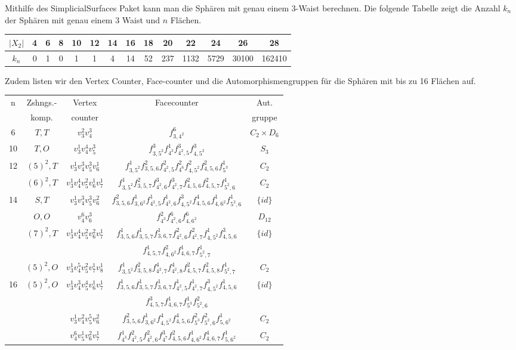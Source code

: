 \documentclass[12pt,titlepage,twoside,cleardoublepage]{article}
\theoremstyle{nummermitklammern}
\numberwithin{equation}{section}
\begin{document}
Mithilfe des SimplicialSurfaces Paket kann man die Sphären mit genau einem 3-Waist berechnen. Die folgende Tabelle zeigt die Anzahl $k_n$ der Sphären mit genau einem 3 Waist und $n$ Flächen. 
\begin{center}
\begin{tabular}[h]{|c|c|c|c|c|c|c|c|c|c|c|c|c|c|}
\hline
\textbf{$\vert X_2\vert$}& \textbf{4} &  \textbf{6}& \textbf{8} & \textbf{10} & \textbf{12} & \textbf{14}&\textbf{16}&\textbf{18}&\textbf{20}&\textbf{22}&\textbf{24}&\textbf{26}&\textbf{28}\\
\hline
 \textbf{$k_n$}  &0& 1& 0& 1 &1& 4& 14& 52 &237& 1132& 5729& 30100& 162410\\
 \hline
\end{tabular}
\end{center}
Zudem listen wir den Vertex Counter, Face-counter und die Automorphismengruppen für die Sphären mit bis zu 16 Flächen auf.
\begin{center}
\begin{tabular}[h]{|c|c|c|c|c|}
\hline
n &Zshngs.-& Vertex & Facecounter & Aut.\\
&komp.&counter&& gruppe\\
 \hline
 6& $T,T$ & $v_3^2v_4^3$&$f^6_{3,4^2}$& $C_2\times D_6$\\
 \hline
10& $T,O$ & $v_3^1v_4^4v_5^3$& $f^3_{3,5^2}f^1_{4^3}f^3_{4^2,5}f^3_{4,5^2}$ &$S_3$\\
 \hline
12& $(5)^2,T$ &$v_3^1v_4^3v_5^3v_6^1$& $f^1_{3,5^2}f^2_{3,5,6}f^2_{4^2,5}f^2_{4^6}f^2_{4,5^2}f^2_{4,5,6}f^1_{5^3}$&$C_2$\\
 \hline
  & $(6)^2,T $& $ v_3^1v_4^4v_5^2v_6^1v_7^1$& $f^1_{3,5^2}f^2_{3,5,7}f^3_{4^2,6}f^3_{4^2,7}f^2_{4,5,6}f^2_{4,5,7}f^1_{5^2,6}$ &$C_2$\\
14& $S,T$& $ v_3^1v_4^3v_5^3v_6^2$& $f^2_{3,5,6}f^1_{3,6^2}f^1_{4^2,5}f^1_{4^2,6}f^3_{4,5^2}f^4_{4,5,6}f^1_{4,6^2}f^1_{5^2,6}$ &$\{id\}$\\
  & $O,O$ & $v_4^6v_6^3$& $f^2_{4^3}f^6_{4^2,6}f^6_{4,6^2} $ & $D_{12}$\\
 \hline
  &$(7)^2,T$ &$v_3^1v_4^4v_5^2v_6^2v_7^1$&$f^1_{3,5,6}f^1_{3,5,7}f^1_{3,6,7}f^2_{4^2,6}f^2_{4^2,7}f^1_{4,5^2}f^3_{4,5,6}$ &$\{id\}$ \\
  &&&$f^1_{4,5,7}f^2_{4,6^2}f^1_{4,6,7}f^1_{5^2,7}$&\\
  & $(5)^2,O$& $v_3^1v_4^5v_5^2v_7^1v_8^1$&$f^1_{3,5^2}f^2_{3,5,8}f^4_{4^2,7}f^4_{4^2,8}f^2_{4,5,7}f^2_{4,5,8}f^1_{5^2,7}$ &$C_2$\\
16& $(5)^2,O$&$ v_3^1v_4^3v_5^4v_6^1v_7^1$&$f^1_{3,5,6}f^1_{3,5,7}f^1_{3,6,7}f^1_{4^2,5}f^1_{4^2,7}f^3_{4,5^2}f^1_{4,5,6}$ &$\{id\}$\\
&&&$f^3_{4,5,7}f^1_{4,6,7}f^1_{5^3}f^2_{5^2,6}$&\\
  &          & $v_3^1v_4^2v_5^5v_6^2$& $f^2_{3,5,6}f^1_{3,6^2}f^4_{4,5^2}f^4_{4,5,6}f^2_{5^3}f^2_{5^2,6}f^1_{5,6^2}$ &$C_2$\\
  &          &$v_4^6v_5^1v_6^2v_7^1$ &$f^1_{4^3}f^2_{4^2,5}f^2_{4^2,6}f^3_{4^7}f^2_{4,5,6}f^1_{4,6^2}f^4_{4,6,7}f^1_{5,6^2}$ &$C_2$\\
 \hline
\end{tabular}
\end{center}
\end{document}

